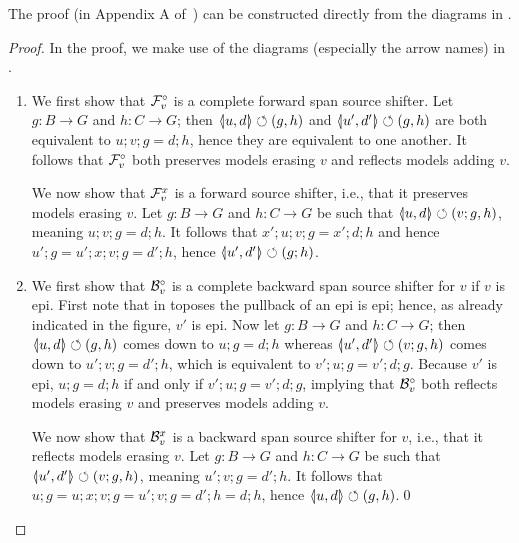 %
\iffest
The proof (in Appendix A of~\cite{RensinkCorradini-JPK2024-full}) can be constructed directly from the diagrams in .
\fi
\begin{fullorname}
\begin{proof}
In the proof, we make use of the diagrams (especially the arrow names) in .
\begin{enumerate}
\item We first show that $\mathcal{F}_v^\circ$ is a complete forward span source shifter. Let $g:B\to G$ and $h:C\to G$; then $\spanof{u}{d}\commutes (g,h)$ and $\spanof{u'}{d'}\commutes (g,h)$ are both equivalent to $u;v;g=d;h$, hence they are equivalent to one another. It follows that $\mathcal{F}_v^\circ$ both  preserves models erasing $v$ and reflects models adding $v$.

We now show that $\mathcal{F}_v^x$ is a forward source shifter, i.e., that it preserves models erasing $v$. Let $g:B\to G$ and $h:C\to G$ be such that $\spanof{u}{d}\commutes (v;g,h)$, meaning $u;v;g=d;h$. It follows that $x';u;v;g=x';d;h$ and hence $u';g=u';x;v;g=d';h$, hence $\spanof{u'}{d'}\commutes (g;h)$.

\item We first show that $\mathcal{B}_v^\circ$ is a complete backward span source shifter for $v$ if $v$ is epi. First note that in toposes the pullback of an epi is epi; hence, as already indicated in the figure, $v'$ is epi. Now let $g:B\to G$ and $h:C\to G$; then $\spanof{u}{d}\commutes (g,h)$ comes down to $u;g=d;h$ whereas $\spanof{u'}{d'}\commutes (v;g,h)$ comes down to $u';v;g=d';h$, which is equivalent to $v';u;g=v';d;g$. Because $v'$ is epi, $u;g=d;h$ if and only if $v';u;g=v';d;g$, implying that $\mathcal{B}_v^\circ$ both reflects models erasing $v$ and preserves models adding $v$.

We now show that $\mathcal{B}_v^x$ is a backward span source shifter for $v$, i.e., that it reflects models erasing $v$. Let $g:B\to G$ and $h:C\to G$ be such that $\spanof{u'}{d'}\commutes (v;g,h)$, meaning $u';v;g=d';h$. It follows that $u;g=u;x;v;g=u';v;g=d';h=d;h$, hence $\spanof u d\commutes (g,h)$.\qed
\end{enumerate}
\end{proof}
\end{fullorname}
%

